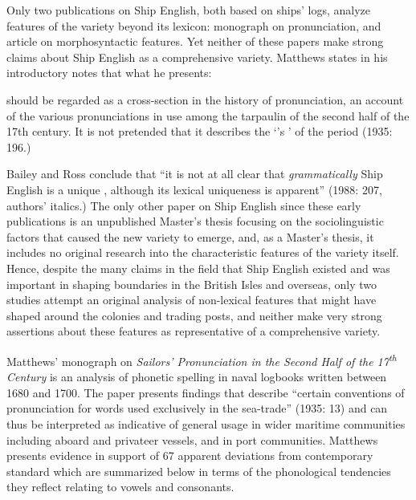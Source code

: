 Only two publications on Ship English, both based on ships’ logs, analyze features of the variety beyond its lexicon: \citet{Matthews1935} monograph on pronunciation, and  article on morphosyntactic features. Yet neither of these papers make strong claims about Ship English as a comprehensive variety. Matthews states in his introductory notes that what he presents:

should be regarded as a cross-section in the history of pronunciation, an account of the various pronunciations in use among the tarpaulin  of the second half of the 17th century. It is not pretended that it describes the ‘’s ’ of the period (1935: 196.)

Bailey and Ross conclude that “it is not at all clear that \textit{grammatically} Ship English is a unique , although its lexical uniqueness is apparent” (1988: 207, authors’ italics.) The only other paper on Ship English since these early publications is an unpublished Master’s thesis \citep{Schultz2010} focusing on the sociolinguistic factors that caused the new variety to emerge, and, as a Master’s thesis, it includes no original research into the characteristic features of the variety itself. Hence, despite the many claims in the field that Ship English existed and was important in shaping  boundaries in the British Isles and overseas, only two studies attempt an original analysis of non-lexical features that might have shaped  around the colonies and trading posts, and neither make very strong assertions about these features as representative of a comprehensive variety.  

Matthews’ monograph on \textit{Sailors’ Pronunciation in the Second Half of the 17\textsuperscript{th} Century} is an analysis of phonetic spelling in naval logbooks written between 1680 and 1700. The paper presents findings that describe “certain conventions of pronunciation for words used exclusively in the sea-trade” (1935: 13) and can thus be interpreted as indicative of general usage in wider maritime communities including aboard  and privateer vessels, and in port communities. Matthews presents evidence in support of 67 apparent deviations from contemporary standard  which are summarized below in terms of the phonological tendencies they reflect relating to vowels and consonants. 

